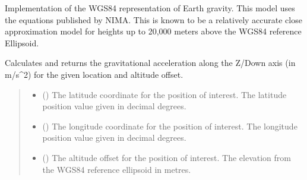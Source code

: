 \documentclass[letterpaper,10pt,english]{sphinxmanual}
\begin{document}
\begin{fulllineitems}
\label{\detokenize{modules/gravity/nima:qnav.gravity.nima.WGS84Gravity}}
\pysigstartsignatures
{}
\pysigstopsignatures
\sphinxAtStartPar
Implementation of the WGS84 representation of Earth gravity.
This model uses the equations published by NIMA. This is known to be
a relatively accurate close approximation model for heights up to
20,000 meters above the WGS84 reference Ellipsoid.

\begin{fulllineitems}
\label{\detokenize{modules/gravity/nima:qnav.gravity.nima.WGS84Gravity.calc_gravity_z}}
\pysigstartsignatures
{}
\pysigstopsignatures
\sphinxAtStartPar
Calculates and returns the gravitational acceleration along the Z/Down
axis (in m/s\textasciicircum{}2) for the given location and altitude offset.
\begin{quote}\begin{description}
\begin{itemize}
\item {} 
\sphinxAtStartPar
{} () \textendash{} The latitude coordinate for the position of interest.
The latitude position value given in decimal degrees.

\item {} 
\sphinxAtStartPar
{} () \textendash{} The longitude coordinate for the position of interest.
The longitude position value given in decimal degrees.

\item {} 
\sphinxAtStartPar
{} () \textendash{} The altitude offset for the position of interest.
The elevation from the WGS\sphinxhyphen{}84 reference ellipsoid in metres.


\end{itemize}
\end{description}
\end{quote}
\end{fulllineitems}
\end{fulllineitems}
\end{document}
